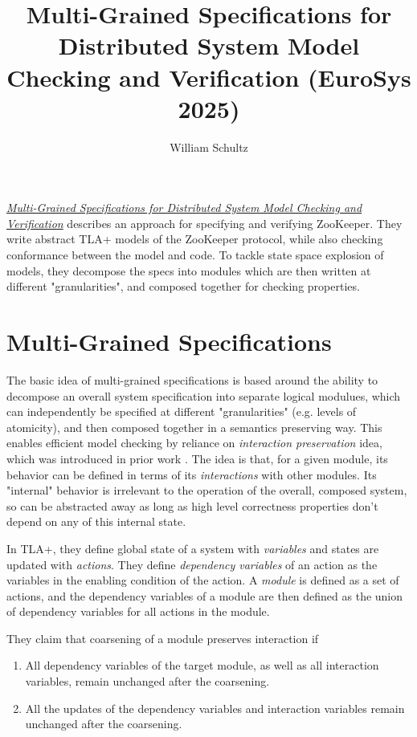 \documentclass[11pt, oneside]{article}   	%
\title{Multi-Grained Specifications for Distributed System Model Checking and Verification (EuroSys 2025)}
\author{William Schultz}
\begin{document}
\maketitle


\href{https://dl.acm.org/doi/10.1145/3689031.3696069}{\textit{Multi-Grained Specifications for Distributed System Model Checking and Verification}} \cite{2025multigrained} describes an approach for specifying and verifying ZooKeeper. They write abstract TLA+ models of the ZooKeeper protocol, while also checking conformance between the model and code. To tackle state space explosion of models, they decompose the specs into modules which are then written at different "granularities", and composed together for checking properties.


\section*{Multi-Grained Specifications}

The basic idea of multi-grained specifications is based around the ability to decompose an overall system specification into separate logical modulues, which can independently be specified at different "granularities" (e.g. levels of atomicity), and then composed together in a semantics preserving way. This enables efficient model checking by reliance on \textit{interaction preservation} idea, which was introduced in prior work \cite{gu2022compositionalmodelcheckingconsensus}. The idea is that, for a given module, its behavior can be defined in terms of its \textit{interactions} with other modules. Its "internal" behavior is irrelevant to the operation of the overall, composed system, so can be abstracted away as long as high level correctness properties don't depend on any of this internal state.

In TLA+, they define global state of a system with \textit{variables} and states are updated with \textit{actions}. They define \textit{dependency variables} of an action as the variables in the enabling condition of the action. A \textit{module} is defined as a set of actions, and the dependency variables of a module are then defined as the union of dependency variables for all actions in the module.

They claim that coarsening of a module preserves interaction if 

\begin{enumerate}[(1)]
    \item All dependency variables of the target module, as well as all interaction variables, remain unchanged after the coarsening.
    \item All the updates of the dependency variables and interaction variables remain unchanged after the coarsening.
\end{enumerate}
\end{document}
